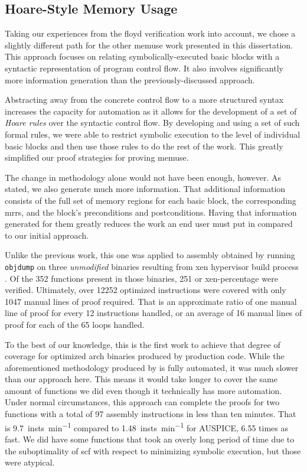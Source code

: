 \subsection{Hoare-Style Memory Usage}
Taking our experiences from the \gls{floyd} verification work into account, we chose a slightly different path for the other \gls{memuse} work presented in this dissertation.
This approach focuses on relating symbolically-executed basic blocks with a syntactic representation of program control flow.
It also involves significantly more information generation than the previously-discussed approach.

Abstracting away from the concrete control flow to a more structured syntax increases the capacity for automation as it allows for the development of a set of \emph{Hoare rules} \autocite{hoare1969axiomatic} over the syntactic control flow.
By developing and using a set of such formal rules, we were able to restrict symbolic execution to the level of individual basic blocks and then use those rules to do the rest of the work.
This greatly simplified our proof strategies for proving \gls{memuse}.

The change in methodology alone would not have been enough, however.
As stated, we also generate much more information.
That additional information consists of the full set of memory regions for each basic block, the corresponding \glspl{mrr}, and the block's preconditions and postconditions.
Having that information generated for them greatly reduces the work an end user must put in compared to our initial approach.

Unlike the previous work, this one was applied to assembly obtained by running \texttt{objdump} on three \emph{unmodified} binaries resulting from \gls{xen} hypervisor build process \autocite{chisnall2008definitive}.
Of the \num{352} functions present in those binaries, \num{251} or \gls{xen-percentage} were verified.
Ultimately, over \num{12252} optimized instructions were covered with only \num{1047} manual lines of proof required.
That is an approximate ratio of one manual line of proof for every \num{12} instructions handled, or an average of \num{16} manual lines of proof for each of the \num{65} loops handled.

To the best of our knowledge, this is the first work to achieve that degree of coverage for optimized \gls{arch} binaries produced by production code.
While the aforementioned methodology produced by \textcite{tan2015auspice} is fully automated, it was much slower than our approach here.
This means it would take longer to cover the same amount of functions we did even though it technically has more automation.
Under normal circumstances, this approach can complete the proofs for two functions with a total of \num{97} assembly instructions in less than ten minutes.
That is \SI{9.7}{insts\per\minute} compared to \SI{1.48}{insts\per\minute} for AUSPICE, \num{6.55} times as fast.
We did have some functions that took an overly long period of time due to the suboptimality of \gls{scf} with respect to minimizing symbolic execution, but those were atypical.

